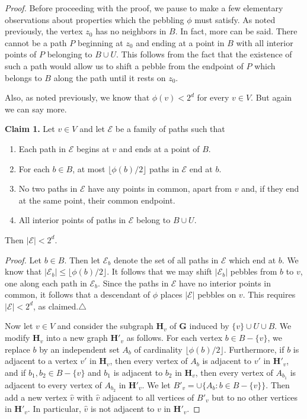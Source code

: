 \documentclass{amsart}
\theoremstyle{remark}
\newcommand{\bfG}{\mathbf{G}}
\newcommand{\bfH}{\mathbf{H}}
\begin{document}
\begin{proof}
Before proceeding with the proof, we pause to make a
few elementary observations about properties which
the pebbling $\phi$ must satisfy.  As noted previously,
the vertex $z_0$ has no neighbors in $B$.  In fact,
more can be said.  There cannot be a path $P$ beginning
at $z_0$ and ending at a point in $B$ with all interior
points of $P$ belonging to $B\cup U$.  This follows
from the fact that the existence of such a path would allow
us to shift a pebble from the endpoint of $P$ which
belongs to $B$ along the path until it rests on $z_0$.  

Also, as noted previously, we know that $\phi(v)<2^d$ for every 
$v\in V$.  But again we can say more.  

\medskip
\noindent\textbf{Claim 1.}
Let $v\in V$ and let
$\mathcal{E}$ be a family of paths such that
\begin{enumerate}
\item Each path in $\mathcal{E}$ begins at $v$ and ends
at a point of $B$.
\item For each $b\in B$, at most $\lfloor\phi(b)/2\rfloor$
paths in $\mathcal{E}$ end at $b$.
\item No two paths in $\mathcal{E}$ have any
points in common, apart from $v$ and, if they end at the same point,
their common endpoint.
\item All interior points of paths in $\mathcal{E}$ belong to $B\cup U$.
\end{enumerate}
Then $|\mathcal{E}|<2^d$.

\medskip\noindent\textit{Proof.}
Let $b\in B$.  Then let $\mathcal{E}_b$ denote the
set of all paths in $\mathcal{E}$ which end at
$b$.  We know that $|\mathcal{E}_b|\le\lfloor\phi(b)/2\rfloor$.
It follows that we may shift $|\mathcal{E}_b|$ pebbles from
$b$ to $v$, one along each path in $\mathcal{E}_b$.
Since the paths in $\mathcal{E}$ have no interior points
in common, it follows that a descendant of $\phi$
places  $|\mathcal{E}|$ pebbles on $v$.  This requires
$|\mathcal{E}|<2^d$, as claimed.\hfill$\triangle$

\medskip
Now let $v\in V$ and consider the subgraph $\bfH_v$
of $\bfG$ induced by $\{v\}\cup U\cup B$.  We modify
$\bfH_v$ into a new graph $\bfH'_v$ as follows.   For 
each vertex $b\in B-\{v\}$, we replace $b$ by
an independent set $A_b$ of cardinality $\lfloor\phi(b)/2\rfloor$.
Furthermore, if $b$ is adjacent to a vertex $v'$ in $\bfH_v$,
then every vertex of $A_b$ is adjacent to $v'$ in $\bfH'_v$,
and if $b_1,b_2\in B-\{v\}$ and $b_1$ is adjacent to
$b_2$ in $\bfH_v$, then every vertex of $A_{b_1}$ is adjacent
to every vertex of $A_{b_2}$ in $\bfH'_v$.  We let $B'_v=
\cup\bigl\{A_b:b\in B-\{ v\}\bigr\}$.  Then add a new
vertex $\hat{v}$ with $\hat{v}$ adjacent to all vertices of
$B'_v$ but to no other vertices in $\bfH'_v$.  In particular,
$\hat{v}$ is not adjacent to $v$ in $\bfH'_v$.


\end{proof}
\end{document}
